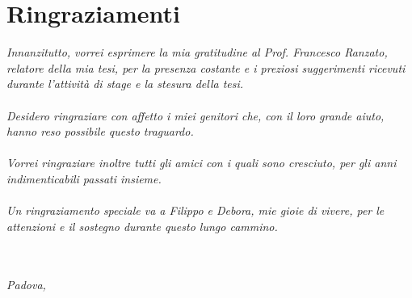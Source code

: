 \cleardoublepage
{}
{}




\bigskip

\begingroup
\let\clearpage\relax
\let\cleardoublepage\relax
\let\cleardoublepage\relax

\chapter{Ringraziamenti}
\textit{Innanzitutto, vorrei esprimere la mia gratitudine al Prof. Francesco Ranzato, relatore della mia tesi, per la presenza costante e i preziosi suggerimenti ricevuti durante l’attività di stage e la stesura della tesi.
	}
\\\\
\textit{
	Desidero ringraziare con affetto i miei genitori che, con il loro grande aiuto, hanno
	reso possibile questo traguardo.
	}
\\\\
\textit{
	Vorrei ringraziare inoltre tutti gli amici con i quali sono cresciuto, per gli anni indimenticabili
	passati insieme.
	}
\\\\
\textit{
	Un ringraziamento speciale va a Filippo e Debora, mie gioie di vivere, per le attenzioni e il sostegno durante questo lungo cammino.
	}
\\\\\\
\begin{flushright}
	\myName
\end{flushright}
\begin{flushleft}
	\textit{Padova, \myTime} 
\end{flushleft}

